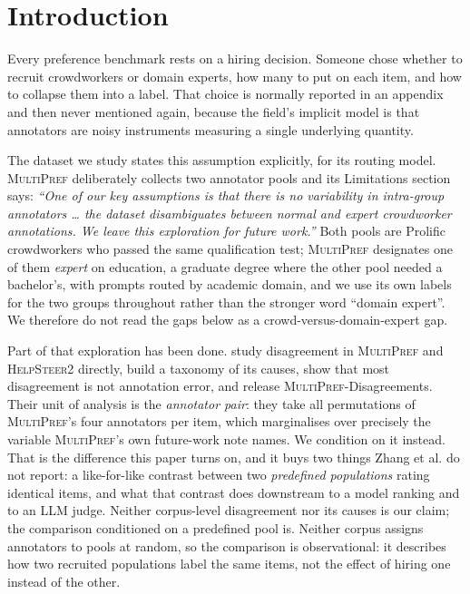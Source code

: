 \documentclass{article}
\begin{document}
\section{Introduction}

Every preference benchmark rests on a hiring decision. Someone chose whether to
recruit crowdworkers or domain experts, how many to put on each item, and how to
collapse them into a label. That choice is normally reported in an appendix and
then never mentioned again, because the field's implicit model is that annotators
are noisy instruments measuring a single underlying quantity.

The dataset we study states this assumption explicitly, for its routing model. \textsc{MultiPref}
\citep{miranda2024hybrid} deliberately collects two annotator pools and its Limitations
section says: \emph{``One of our key assumptions is that there is no variability in
intra-group annotators \ldots{} the dataset disambiguates between normal and expert
crowdworker annotations. We leave this exploration for future work.''} Both pools are
Prolific crowdworkers who passed the same qualification test; \textsc{MultiPref} designates
one of them \emph{expert} on education, a graduate degree where the other pool needed a
bachelor's, with prompts routed by academic domain, and we use its own labels for the two groups throughout rather than the
stronger word ``domain expert''. We therefore do not read the gaps below as a
crowd-versus-domain-expert gap.

Part of that exploration has been done. \citet{zhang2025diverging} study disagreement in
\textsc{MultiPref} and \textsc{HelpSteer2} directly, build a taxonomy of its causes, show
that most disagreement is not annotation error, and release
\textsc{MultiPref}-Disagreements. Their unit of analysis is the \emph{annotator pair}: they
take all permutations of \textsc{MultiPref}'s four annotators per item, which marginalises
over precisely the variable \textsc{MultiPref}'s own future-work note names. We condition on
it instead. That is the difference this paper turns on, and it buys two things Zhang et al.
do not report: a like-for-like contrast between two \emph{predefined populations} rating
identical items, and what that contrast does downstream to a model ranking and to an LLM
judge. Neither corpus-level disagreement nor its causes is our claim; the comparison
conditioned on a predefined pool is. Neither corpus assigns annotators to pools at random,
so the comparison is observational: it describes how two recruited populations label the
same items, not the effect of hiring one instead of the other.
\end{document}
